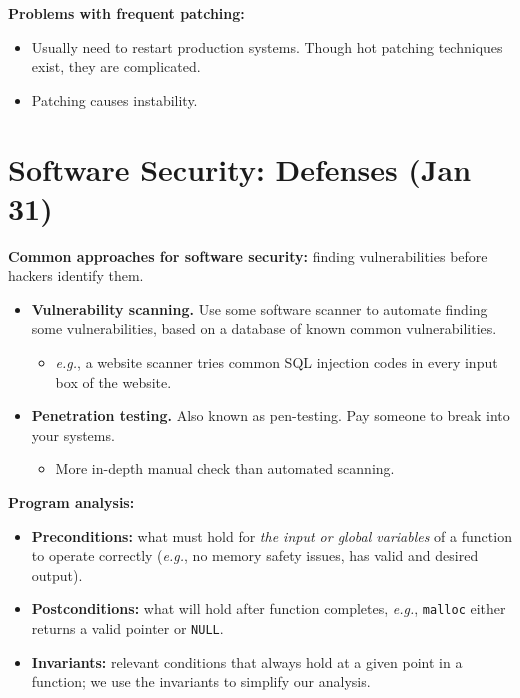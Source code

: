 \documentclass{article}
\newcommand{\parhead}[1]{\noindent \textbf{#1}}
\begin{document}
\parhead{Problems with frequent patching:}
\begin{itemize}
    \item Usually need to restart production systems. Though hot patching techniques exist, they are complicated.
    
    \item Patching causes instability.
\end{itemize}

\newpage
\section{Software Security: Defenses (Jan 31)}
\parhead{Common approaches for software security:} finding vulnerabilities before hackers identify them.
\begin{itemize}
    \item \textbf{Vulnerability scanning.} Use some software scanner to automate finding some vulnerabilities, based on a database of known common vulnerabilities.
    \begin{itemize}
        \item \emph{e.g.}, a website scanner tries common SQL injection codes in every input box of the website.
    \end{itemize}
    
    \item \textbf{Penetration testing.} Also known as pen-testing. Pay someone to break into your systems.
    \begin{itemize}
        \item More in-depth manual check than automated scanning.
    \end{itemize}
\end{itemize}

\parhead{Program analysis:}
\begin{itemize}
    \item \textbf{Preconditions:} what must hold for \emph{the input or global variables} of a function to operate correctly (\emph{e.g.}, no memory safety issues, has valid and desired output).
    
    \item \textbf{Postconditions:} what will hold after function completes, \emph{e.g.}, \texttt{malloc} either returns a valid pointer or \texttt{NULL}.
    
    \item \textbf{Invariants:} relevant conditions that always hold at a given point in a function; we use the invariants to simplify our analysis.
\end{itemize}
\end{document}

